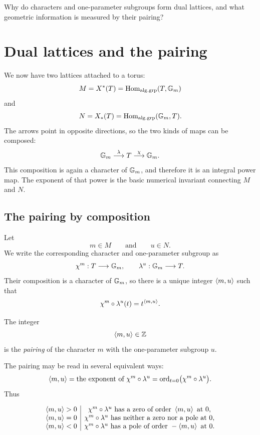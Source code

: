 \begin{guidingquestion}
Why do characters and one-parameter subgroups form dual lattices, and
what geometric information is measured by their pairing?
\end{guidingquestion}


\section{Dual lattices and the pairing}
\label{sec:dual-lattices-pairing}

We now have two lattices attached to a torus:
\[
M=X^*(T)
=
\operatorname{Hom}_{\mathrm{alg.grp}}(T,\mathbb{G}_{m})
\]
and
\[
N=X_*(T)
=
\operatorname{Hom}_{\mathrm{alg.grp}}(\mathbb{G}_{m},T).
\]
The arrows point in opposite directions, so the two kinds of maps can
be composed:
\[
\mathbb{G}_{m}
\overset{\lambda}{\longrightarrow}
T
\overset{\chi}{\longrightarrow}
\mathbb{G}_{m}.
\]
This composition is again a character of \(\mathbb{G}_{m}\), and therefore it is
an integral power map. The exponent of that power is the basic
numerical invariant connecting \(M\) and \(N\).

\subsection{The pairing by composition}

Let
\[
m\in M
\qquad\text{and}\qquad
u\in N.
\]
We write the corresponding character and one-parameter subgroup as
\[
\chi^{m}:T\longrightarrow\mathbb{G}_{m},
\qquad
\lambda^{u}:\mathbb{G}_{m}\longrightarrow T.
\]
Their composition is a character of \(\mathbb{G}_{m}\), so there is a unique
integer \(\left\langle m,u\right\rangle\) such that
\[
\chi^{m}\circ\lambda^{u}(t)
=
t^{\left\langle m,u\right\rangle}.
\]

\begin{definition}
The integer
\[
\left\langle m,u\right\rangle\in\mathbb{Z}
\]
is the \emph{pairing} of the character \(m\) with the one-parameter
subgroup \(u\).
\end{definition}

The pairing may be read in several equivalent ways:
\[
\left\langle m,u\right\rangle
=
\text{the exponent of }\chi^{m}\circ\lambda^{u}
=
\operatorname{ord}_{t=0}\bigl(\chi^{m}\circ\lambda^{u}\bigr).
\]
Thus

\[
\begin{array}{c|c}
\left\langle m,u\right\rangle>0
&
\chi^{m}\circ\lambda^{u}
\text{ has a zero of order }\left\langle m,u\right\rangle\text{ at }0,
\\
\left\langle m,u\right\rangle=0
&
\chi^{m}\circ\lambda^{u}
\text{ has neither a zero nor a pole at }0,
\\
\left\langle m,u\right\rangle<0
&
\chi^{m}\circ\lambda^{u}
\text{ has a pole of order }-\left\langle m,u\right\rangle\text{ at }0.
\end{array}
\]

